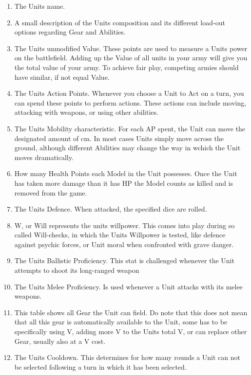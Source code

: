 \documentclass[a4paper,12pt]{report}
\begin{document}
\pagebreak

\begin{adjustwidth}{-2cm}{-2cm}
\begin{multicols}{2}
\begin{enumerate}

	\item The Units name. 
	\item A small description of the Units composition and its different load-out options regarding Gear and Abilities.
	\item The Units unmodified Value. These points are used to measure a Units power on the battlefield. Adding up the Value of all units in your army will give you the total value of your army. To achieve fair play, competing armies should have similar, if not equal Value.
	\item The Units Action Points. Whenever you choose a Unit to Act on a turn, you can spend these points to perform actions. These actions can include moving, attacking with weapons, or using other abilities.
	\item The Units Mobility characteristic. For each AP spent, the Unit can move the designated amount of cm. In most cases Units simply move across the ground, although different Abilities may change the way in wchich the Unit moves dramatically.
	\item How many Health Points each Model in the Unit possesses. Once the Unit has taken more damage than it has HP the Model counts as killed and is removed from the game.
	\item The Units Defence. When attacked, the specified dice are rolled.
	\item W, or Will represents the units willpower. This comes into play during so called Will-checks, in which the Units Willpower is tested, like defence against psychic forces, or Unit moral when confronted with grave danger.
	\item The Units Ballistic Proficiency. This stat is challenged whenever the Unit attempts to shoot its long-ranged weapon
	\item The Units Melee Proficiency. Is used whenever a Unit attacks with its melee weapons.
	\item This table shows all Gear the Unit can field. Do note that this does not mean that all this gear is automatically available to the Unit, some has to be specifically  using V, adding more V to the Units total V, or can replace other Gear, usually also at a V cost.
	\item The Units Cooldown. This determines for how many rounds a Unit can not be selected following a turn in which it has been selected.

\end{enumerate}
\end{multicols}
\end{adjustwidth}
\end{document}
